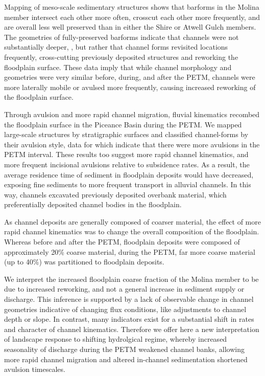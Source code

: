 \documentclass[draft]{compact_proposal}
\begin{document}
Mapping of meso-scale sedimentary structures shows that barforms in the Molina member intersect each other more often, crosscut each other more frequently, and are overall less well preserved than in either the Shire or Atwell Gulch members.
The geometries of fully-preserved barforms indicate that channels were not substantially deeper, , but rather that channel forms revisited locations frequently, cross-cutting previously deposited structures and reworking the floodplain surface.
These data imply that while channel morphology and geometries were very similar before, during, and after the PETM, channels were more laterally mobile or avulsed more frequently, causing increased reworking of the floodplain surface.

Through avulsion and more rapid channel migration, fluvial kinematics recombed the floodplain surface in the Piceance Basin during the PETM.
We mapped large-scale structures by stratigraphic surfaces and classified channel-forms by their avulsion style, data for which indicate that there were more  avulsions in the PETM interval.
These results too suggest more rapid channel kinematics, and more frequent incisional avulsions relative to subsidence rates.
As a result, the average residence time of sediment in floodplain deposits would have decreased, exposing fine sediments to more frequent transport in alluvial channels.
In this way, channels excavated previously deposited overbank material, which preferentially deposited channel bodies in the floodplain.

As channel deposits are generally composed of coarser material, the effect of more rapid channel kinematics was to change the overall composition of the floodplain.
Whereas before and after the PETM, floodplain deposits were composed of approximately 20\% coarse material, during the PETM, far more coarse material (up to 40\%) was partitioned to floodplain deposits.

We interpret the increased floodplain coarse fraction of the Molina member to be due to increased reworking, and not a general increase in sediment supply or discharge.
This inference is supported by a lack of observable change in channel geometries indicative of changing flux conditions, like adjustments to channel depth or slope.
In contrast, many indicators exist for a substantial shift in rates and character of channel kinematics.
Therefore we offer here a new interpretation of landscape response to shifting hydrolgical regime, whereby increased seasonality of discharge during the PETM weakened channel banks, allowing more rapid channel migration and altered in-channel sedimentation shortened avulsion timescales.
\end{document}
